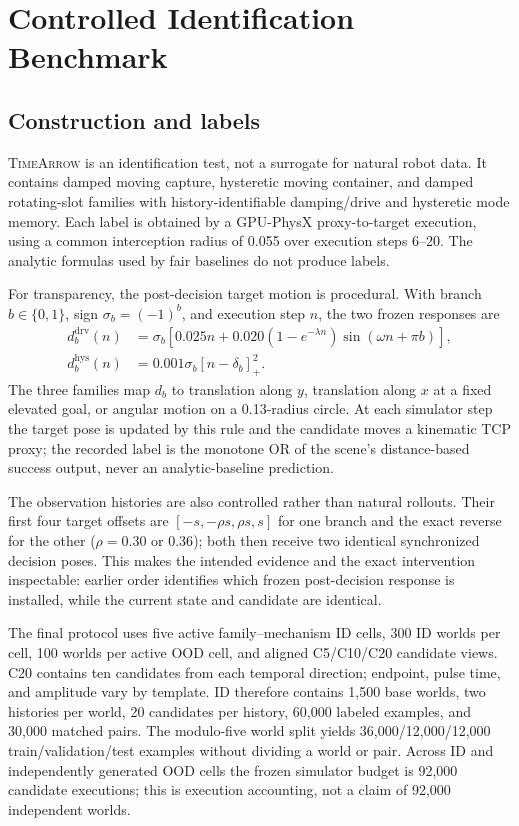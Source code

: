 \documentclass[letterpaper,10pt,conference]{ieeeconf}
\begin{document}
\section{Controlled Identification Benchmark}

\subsection{Construction and labels}

\textsc{TimeArrow} is an identification test, not a surrogate for natural
robot data. It contains damped moving capture, hysteretic moving container,
and damped rotating-slot families with history-identifiable damping/drive and
hysteretic mode memory. Each label is obtained by a
GPU-PhysX proxy-to-target execution, using a common interception radius of
0.055 over execution steps 6--20. The analytic formulas used by fair baselines
do not produce labels.

For transparency, the post-decision target motion is procedural. With branch
$b\in\{0,1\}$, sign $\sigma_b=(-1)^b$, and execution step $n$, the two frozen
responses are
\begin{align}
d_b^{\mathrm{drv}}(n)&=\sigma_b\!\left[0.025n+0.020(1-e^{-\lambda n})
\sin(\omega n+\pi b)\right],\\
d_b^{\mathrm{hys}}(n)&=0.001\sigma_b[n-\delta_b]_+^2.
\end{align}
The three families map $d_b$ to translation along $y$, translation along $x$
at a fixed elevated goal, or angular motion on a 0.13-radius circle. At each
simulator step the target pose is updated by this rule and the candidate moves
a kinematic TCP proxy; the recorded label is the monotone OR of the scene's
distance-based success output, never an analytic-baseline prediction.

The observation histories are also controlled rather than natural rollouts.
Their first four target offsets are $[-s,-\rho s,\rho s,s]$ for one branch and
the exact reverse for the other ($\rho=0.30$ or $0.36$); both then receive two
identical synchronized decision poses. This makes the intended evidence and
the exact intervention inspectable: earlier order identifies which frozen
post-decision response is installed, while the current state and candidate are
identical.

The final protocol uses five active family--mechanism ID cells, 300 ID worlds
per cell, 100 worlds per active OOD cell, and aligned C5/C10/C20 candidate
views. C20 contains ten candidates from each temporal direction; endpoint,
pulse time, and amplitude vary by template. ID therefore contains 1,500 base
worlds, two histories per world, 20 candidates per history, 60,000 labeled
examples, and 30,000 matched pairs. The modulo-five world split yields
36,000/12,000/12,000 train/validation/test examples without dividing a world
or pair. Across ID and independently generated OOD cells the frozen simulator
budget is 92,000 candidate executions; this is execution accounting, not a
claim of 92,000 independent worlds.
\end{document}
